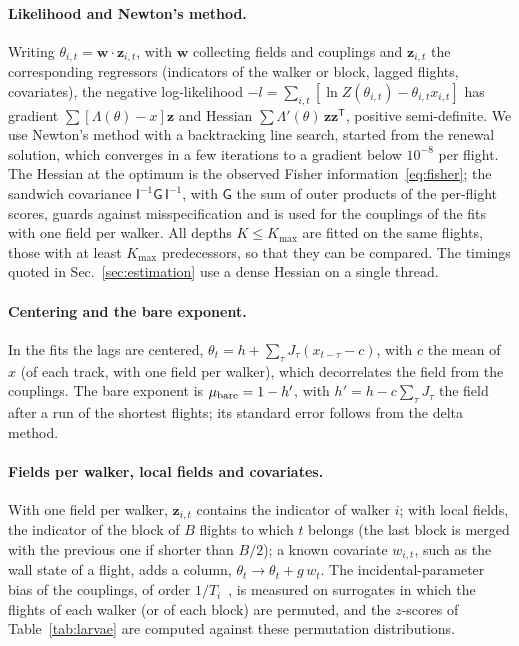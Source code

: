 \paragraph{Likelihood and Newton's method.} Writing $\theta_{i,t}=\bm w\cdot\bm z_{i,t}$, with $\bm w$ collecting fields and couplings and $\bm z_{i,t}$ the corresponding regressors (indicators of the walker or block, lagged flights, covariates), the negative log-likelihood $-l=\sum_{i,t}[\ln Z(\theta_{i,t})-\theta_{i,t}x_{i,t}]$ has gradient $\sum[\Lambda(\theta)-x]\bm z$ and Hessian $\sum\Lambda'(\theta)\,\bm z\bm z^{\mathsf T}$, positive semi-definite. We use Newton's method with a backtracking line search, started from the renewal solution, which converges in a few iterations to a gradient below $10^{-8}$ per flight. The Hessian at the optimum is the observed Fisher information~\eqref{eq:fisher}; the sandwich covariance $\mathsf I^{-1}\mathsf G\,\mathsf I^{-1}$, with $\mathsf G$ the sum of outer products of the per-flight scores, guards against misspecification and is used for the couplings of the fits with one field per walker. All depths $K\le K_{\max}$ are fitted on the same flights, those with at least $K_{\max}$ predecessors, so that they can be compared. The timings quoted in Sec.~\ref{sec:estimation} use a dense Hessian on a single thread.

\paragraph{Centering and the bare exponent.} In the fits the lags are centered, $\theta_t=h+\sum_\tau J_\tau(x_{t-\tau}-c)$, with $c$ the mean of $x$ (of each track, with one field per walker), which decorrelates the field from the couplings. The bare exponent is $\mu_{\rm bare}=1-h'$, with $h'=h-c\sum_\tau J_\tau$ the field after a run of the shortest flights; its standard error follows from the delta method.

\paragraph{Fields per walker, local fields and covariates.} With one field per walker, $\bm z_{i,t}$ contains the indicator of walker $i$; with local fields, the indicator of the block of $B$ flights to which $t$ belongs (the last block is merged with the previous one if shorter than $B/2$); a known covariate $w_{i,t}$, such as the wall state of a flight, adds a column, $\theta_t\to\theta_t+g\,w_t$. The incidental-parameter bias of the couplings, of order $1/T_i$~\cite{Nickell1981}, is measured on surrogates in which the flights of each walker (or of each block) are permuted, and the $z$-scores of Table~\ref{tab:larvae} are computed against these permutation distributions.


